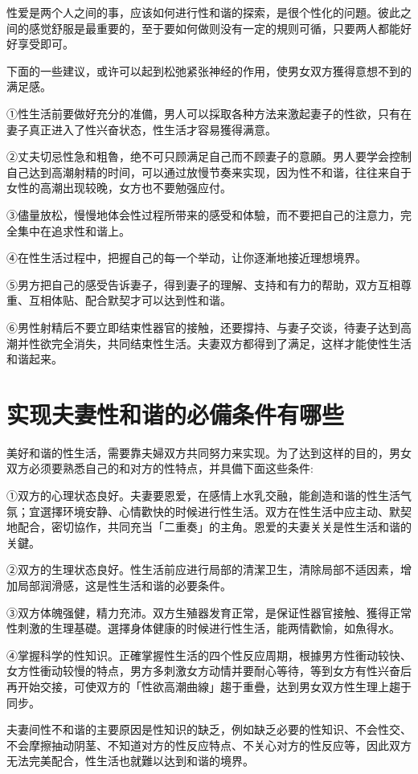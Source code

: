 \documentclass[12pt,UTF8]{ctexbook}
\begin{document}
性爱是两个人之间的事，应该如何进行性和谐的探索，是很个性化的问題。彼此之间的感觉舒服是最重要的，至于要如何做则没有一定的規则可循，只要两人都能好好享受即可。

下面的一些建议，或许可以起到松弛紧张神经的作用，使男女双方獲得意想不到的满足感。

①性生活前要做好充分的准備，男人可以採取各种方法来激起妻子的性欲，只有在妻子真正进入了性兴奋状态，性生活才容易獲得满意。

②丈夫切忌性急和粗魯，绝不可只顾满足自己而不顾妻子的意願。男人要学会控制自己达到高潮射精的时间，可以通过放慢节奏来实现，因为性不和谐，往往来自于女性的高潮出现较晚，女方也不要勉强应付。

③儘量放松，慢慢地体会性过程所带来的感受和体驗，而不要把自己的注意力，完全集中在追求性和谐上。

④在性生活过程中，把握自己的每一个举动，让你逐漸地接近理想境界。

⑤男方把自己的感受告诉妻子，得到妻子的理解、支持和有力的帮助，双方互相尊重、互相体贴、配合默契才可以达到性和谐。

⑥男性射精后不要立即结束性器官的接触，还要撐持、与妻子交谈，待妻子达到高潮并性欲完全消失，共同结束性生活。夫妻双方都得到了满足，这样才能使性生活和谐起来。

\section{实现夫妻性和谐的必備条件有哪些}

美好和谐的性生活，需要靠夫婦双方共同努力来实现。为了达到这样的目的，男女双方必须要熟悉自己的和对方的性特点，并具備下面这些条件:

①双方的心理状态良好。夫妻要恩爱，在感情上水乳交融，能創造和谐的性生活气氛；宜選擇环境安静、心情歡快的时候进行性生活。双方在性生活中应主动、默契地配合，密切協作，共同充当「二重奏」的主角。恩爱的夫妻关关是性生活和谐的关鍵。

②双方的生理状态良好。性生活前应进行局部的清潔卫生，清除局部不适因素，增加局部润滑感，这是性生活和谐的必要条件。

③双方体魄强健，精力充沛。双方生殖器发育正常，是保证性器官接触、獲得正常性刺激的生理基礎。選擇身体健康的时候进行性生活，能两情歡愉，如魚得水。

④掌握科学的性知识。正確掌握性生活的四个性反应周期，根據男方性衝动较快、女方性衝动较慢的特点，男方多刺激女方动情并要耐心等待，等到女方有性兴奋后再开始交接，可使双方的「性欲高潮曲線」趨于重疊，达到男女双方性生理上趨于同步。

夫妻间性不和谐的主要原因是性知识的缺乏，例如缺乏必要的性知识、不会性交、不会摩擦抽动阴茎、不知道对方的性反应特点、不关心对方的性反应等，因此双方无法完美配合，性生活也就難以达到和谐的境界。
\end{document}
